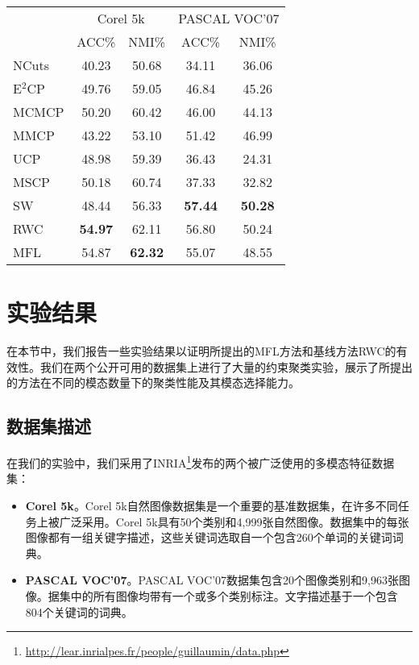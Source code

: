 \begin{table}[tb]
	\label{tab3:2modal}
	\centering
	\setlength{\tabcolsep}{15pt}
	\begin{tabular}{lcccc}
		\toprule
		&\multicolumn{2}{c}{Corel 5k} & \multicolumn{2}{c}{PASCAL VOC'07} \\
		\cmidrule(lr){2-3}
		\cmidrule(lr){4-5}
		& ACC\% & NMI\% & ACC\% & NMI\% \\
		\midrule
		NCuts\cite{shi2000normalized} & 40.23 & 50.68 & 34.11 & 36.06 \\ 
		E$^2$CP\cite{lu2010constrained} & 49.76 & 59.05 & 46.84 & 45.26 \\
		MCMCP\cite{fu2012modalities} & 50.20 & 60.42 & 46.00 & 44.13 \\  
		MMCP\cite{fu2011multi} & 43.22 & 53.10 & 51.42 & 46.99 \\ 
		UCP\cite{lu2013unified} & 48.98 & 59.39 & 36.43 & 24.31 \\ 
		MSCP\cite{lu2013exhaustive} & 50.18 & 60.74 & 37.33 & 32.82 \\ 
		\midrule
		SW & 48.44 & 56.33 & \textbf{57.44} & \textbf{50.28} \\ 
		RWC & \textbf{54.97} & 62.11 & 56.80 & 50.24 \\ 
		MFL & 54.87 & \textbf{62.32} & 55.07 & 48.55 \\ 
		\bottomrule
	\end{tabular}
\end{table}


\section{实验结果}
\label{sec3:exp}
在本节中，我们报告一些实验结果以证明所提出的MFL方法和基线方法RWC的有效性。我们在两个公开可用的数据集上进行了大量的约束聚类实验，展示了所提出的方法在不同的模态数量下的聚类性能及其模态选择能力。

\subsection{数据集描述}
在我们的实验中，我们采用了INRIA\footnote{\url{http://lear.inrialpes.fr/people/guillaumin/data.php}}发布的两个被广泛使用的多模态特征数据集\cite{guillaumin2009tagprop}：
\begin{itemize}
    \item {\textbf{Corel 5k}}。Corel 5k自然图像数据集是一个重要的基准数据集，在许多不同任务上被广泛采用。Corel 5k具有50个类别和4,999张自然图像。数据集中的每张图像都有一组关键字描述，这些关键词选取自一个包含260个单词的关键词词典。
    \item {\textbf{PASCAL VOC'07}}。PASCAL VOC'07数据集\cite{pascal-voc-2007}包含20个图像类别和9,963张图像。据集中的所有图像均带有一个或多个类别标注。文字描述基于一个包含804个关键词的词典。
\end{itemize}

